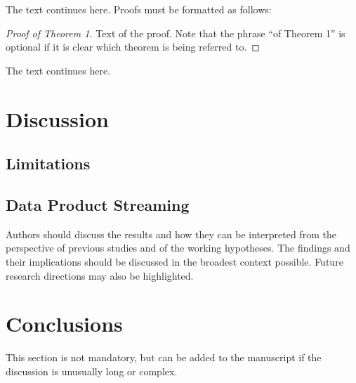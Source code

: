 \documentclass[journal,article,submit,pdftex,moreauthors]{Definitions/mdpi}
\begin{document}
The text continues here. Proofs must be formatted as follows:

\begin{proof}[Proof of Theorem 1]
Text of the proof. Note that the phrase ``of Theorem 1'' is optional if it is clear which theorem is being referred to.
\end{proof}
The text continues here.

\section{Discussion} \label{sec:discussion}

\subsection{Limitations}

\subsection{Data Product Streaming}

Authors should discuss the results and how they can be interpreted from the perspective of previous studies and of the working hypotheses. The findings and their implications should be discussed in the broadest context possible. Future research directions may also be highlighted.

\section{Conclusions}

This section is not mandatory, but can be added to the manuscript if the discussion is unusually long or complex.


\vspace{6pt} 


\end{document}
